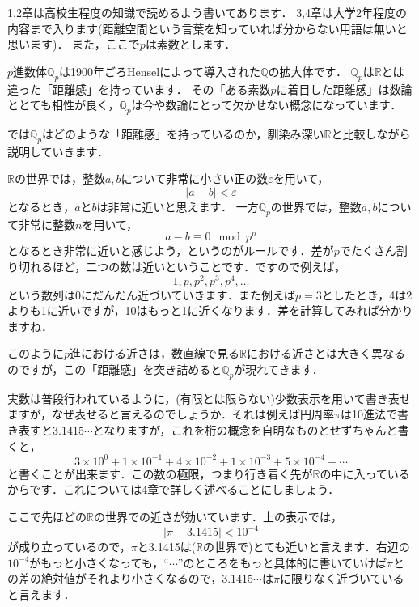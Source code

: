 \documentclass[./main]{subfiles}
\begin{document}
 

\theoremstyle{definition} 
\newtheorem{theo}{Thm}[section]
\newtheorem{defi}[theo]{Def}
\newtheorem{prop}[theo]{Prop}
\newcommand{\N}{\mathbb{N}}%
\newcommand{\Z}{\mathbb{Z}}%
\newcommand{\Q}{\mathbb{Q}}%
\newcommand{\Qp}{\mathbb{Q}_p}%
\newcommand{\R}{\mathbb{R}}%
\newcommand{\abs}[1]{\left\lvert#1\right\rvert}%


1,2章は高校生程度の知識で読めるよう書いてあります．
3,4章は大学2年程度の内容まで入ります(距離空間という言葉を知っていれば分からない用語は無いと思います)．
また，ここで$p$は素数とします．


$p$進数体$\Qp$は1900年ごろHenselによって導入された$\Q$の拡大体です．
$\Qp$は$\R$とは違った「距離感」を持っています．
その「ある素数$p$に着目した距離感」は数論ととても相性が良く，$\Qp$は今や数論にとって欠かせない概念になっています．

では$\Qp$はどのような「距離感」を持っているのか，馴染み深い$\R$と比較しながら説明していきます．

$\R$の世界では，整数$a,b$について非常に小さい正の数$\varepsilon$を用いて，
\[
\abs{a-b}<\varepsilon
\]
となるとき，$a$と$b$は非常に近いと思えます．
一方$\Qp$の世界では，整数$a,b$について非常に整数$n$を用いて，
\[
a-b \equiv 0 \mod{p^n}
\]
となるとき非常に近いと感じよう，というのがルールです．差が$p$でたくさん割り切れるほど，二つの数は近いということです．ですので例えば，
\[
1,p,p^2,p^3,p^4,\dotsc
\]
という数列は0にだんだん近づいていきます．また例えば$p=3$としたとき，4は2よりも1に近いですが，10はもっと1に近くなります．差を計算してみれば分かりますね．

このように$p$進における近さは，数直線で見る$\R$における近さとは大きく異なるのですが，この「距離感」を突き詰めると$\Qp$が現れてきます．


\Section{$p$進展開で$\Qp$を定めよう}

実数は普段行われているように，(有限とは限らない)少数表示を用いて書き表せますが，なぜ表せると言えるのでしょうか．それは例えば円周率$\pi$は10進法で書き表すと$3.1415\cdots$となりますが，これを桁の概念を自明なものとせずちゃんと書くと，
\[
3 \times 10^0 + 1 \times 10^{-1} + 4 \times 10^{-2} + 1\times 10^{-3} + 5 \times 10^{-4}+ \cdots
\]
と書くことが出来ます．この数の極限，つまり行き着く先が$\R$の中に入っているからです．これについては4章で詳しく述べることにしましょう．

ここで先ほどの$\R$の世界での近さが効いています．上の表示では，
\[
\abs{\pi-3.1415}<10^{-4}
\]
が成り立っているので，$\pi$と3.1415は($\R$の世界で)とても近いと言えます．右辺の$10^{-4}$がもっと小さくなっても，``$\cdots$''のところをもっと具体的に書いていけば$\pi$との差の絶対値がそれより小さくなるので，$3.1415\cdots$は$\pi$に限りなく近づいていると言えます．
\end{document}
